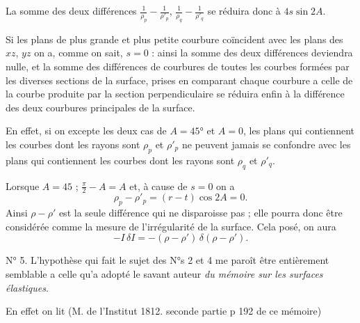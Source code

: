 \documentclass[11pt,a4paper]{article}
\begin{document}
La somme des deux différences $\frac{1}{\rho_p} - \frac{1}{\rho'_p}$,
$\frac{1}{\rho_q} - \frac{1}{\rho'_q}$ se réduira donc à $4s\sin 2A$.

Si les plans de plus grande et plus petite courbure coïncident avec les plans
des $xz$, $yz$ on a, comme on sait, $s=0$ : ainsi la somme des deux
différences deviendra nulle, et la somme des différences de courbures de
toutes les courbes formées par les diverses sections de la surface, prises en
comparant chaque courbure a celle de la courbe produite par la section
perpendiculaire se réduira enfin à la différence des deux courbures
principales de la surface.

En effet, si on excepte les deux cas de $A = 45°$ et $A = 0$, les plans qui
contiennent les courbes dont les rayons sont $\rho_p$ et $\rho'_p$ ne peuvent
jamais se confondre avec les plans qui contiennent les courbes dont les rayons
sont $\rho_q$ et $\rho'_q$.

Lorsque $A = 45$ ; $\frac{\pi}{2} - A = A$ et, à cause de $s=0$ on a
\[
  \rho_p - \rho'_p = (r-t)\cos 2A = 0 .
\]
Ainsi $\rho - \rho'$ est la seule différence qui ne disparoisse pas ; elle
pourra donc être considérée comme la mesure de l'irrégularité de la surface.
Cela posé, on aura
\[
  -I\,\delta I = -(\rho-\rho')\,\delta(\rho-\rho') .
\]

N° 5. L'hypothèse qui fait le sujet des N°s 2 et 4 me paroît être entièrement
semblable a celle qu'a adopté le savant auteur \emph{du mémoire sur les
surfaces élastiques}.

En effet on lit (M. de l'Institut 1812. seconde partie p 192
 de ce mémoire)
\end{document}
